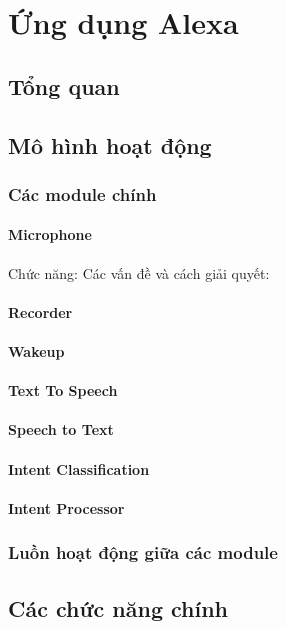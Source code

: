 \chapter{Ứng dụng Alexa}
\ifpdf
    \graphicspath{{Chapter5/Chapter5Figs/PNG/}{Chapter5/Chapter5Figs/PDF/}{Chapter5/Chapter5Figs/}}
\else
    \graphicspath{{Chapter5/Chapter5Figs/EPS/}{Chapter5/Chapter5Figs/}}
\fi

\section{Tổng quan}
\section{Mô hình hoạt động}
\subsection{Các module chính}
\subsubsection{Microphone}
Chức năng:
Các vấn đề và cách giải quyết:
\subsubsection{Recorder}
\subsubsection{Wakeup}
\subsubsection{Text To Speech}
\subsubsection{Speech to Text}
\subsubsection{Intent Classification}
\subsubsection{Intent Processor}
\subsection{Luồn hoạt động giữa các module}
\section{Các chức năng chính}

